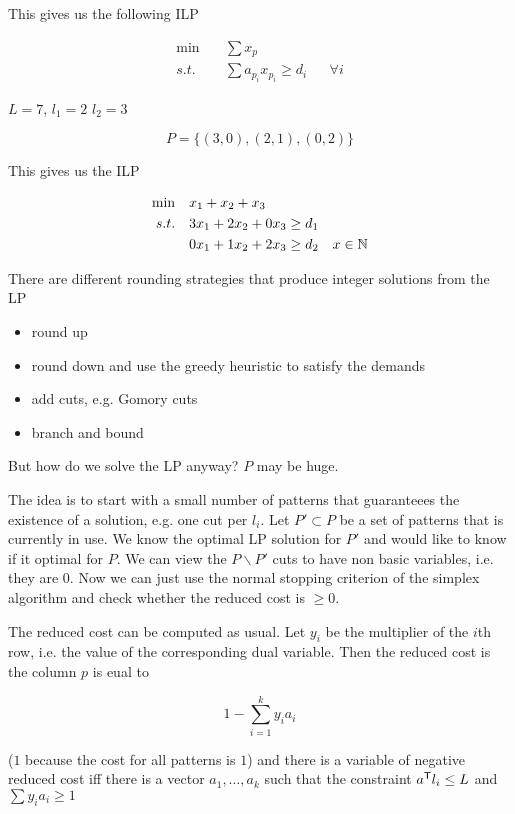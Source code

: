 This gives us the following ILP

\begin{align*}
\min \quad & \sum x_p\\
s.t. \quad & \sum a_{p_i}x_{p_i} \geq d_i && \forall i
\end{align*}

\begin{Ex} $L=7$, $l_1=2$ $l_2=3$

\[P=\{(3,0),(2,1),(0,2)\}\]

This gives us the ILP

\begin{align*}
\min \quad & x_1+x_2+x_3\\
s.t.\quad & 3x_1+2x_2+0x_3 \geq d_1\\
	&0x_1 + 1x_2+ 2x_3 \geq d_2
	&x\in \mathbb{N}
\end{align*}
\end{Ex}

There are different rounding strategies that produce integer solutions from the LP

\begin{itemize}
\item round up
\item round down and use the greedy heuristic to satisfy the demands
\item add cuts, e.g. Gomory cuts
\item branch and bound
\end{itemize}

But how do we solve the LP anyway? $P$ may be huge.

The idea is to start with a small number of patterns that guaranteees the existence of a solution, e.g. one cut per $l_i$. Let $P'\subset P$ be a set of patterns that is currently in use. We know the optimal LP solution for $P'$ and would like to know if it optimal for $P$. We can view the $P\backslash P'$ cuts to have non basic variables, i.e. they are 0. Now we can just use the normal stopping criterion of the simplex algorithm and check whether the reduced cost is $\geq 0$.

The reduced cost can be computed as usual. Let $y_i$ be the multiplier of the $i$th row, i.e. the value of the corresponding dual variable. Then the reduced cost is the column $p$ is eual to

\[1-\sum_{i=1}^k y_ia_i\]

($1$ because the cost for all patterns is $1$) and there is a variable of negative reduced cost iff there is a vector $a_1,\ldots,a_k$ such that the constraint ${a}^\text{\upshape \sffamily T} l_i \leq L$ and $\sum y_ia_i \geq 1$

